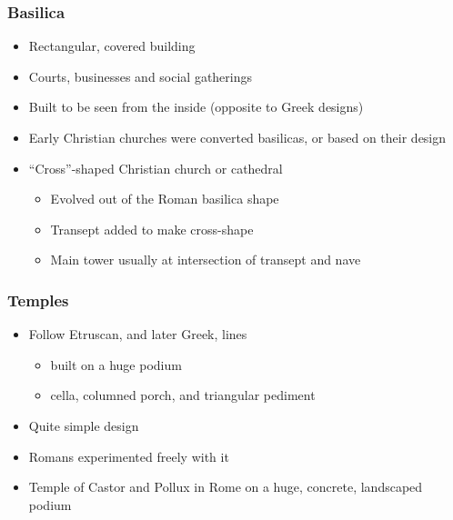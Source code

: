 \documentclass[12pt, twoside]{article}
\begin{document}
\subsubsection{Basilica}
\begin{itemize}
\item Rectangular, covered building
\item Courts, businesses and social gatherings
\item Built to be seen from the inside (opposite to Greek designs)
\item Early Christian churches were converted basilicas, or based on their design
\item “Cross”-shaped Christian church or cathedral
	\begin{itemize}
	\item Evolved out of the Roman basilica shape
	\item Transept added to make cross-shape
	\item Main tower usually at intersection of transept and nave
	\end{itemize}
\end{itemize}

\subsubsection{Temples}
\begin{itemize}
\item Follow Etruscan, and later Greek, lines
	\begin{itemize}
	\item built on a huge podium
	\item cella, columned porch, and triangular pediment
	\end{itemize}
\item Quite simple design
\item Romans experimented freely with it
\item Temple of Castor and Pollux in Rome on a huge, concrete, landscaped podium 
\end{itemize}
\end{document}

